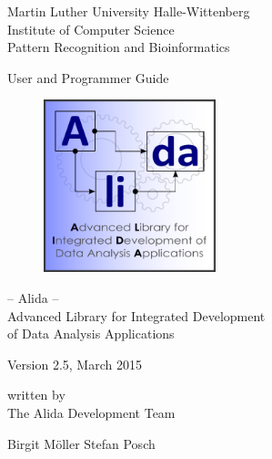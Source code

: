 
\thispagestyle{empty}

\begin{flushleft}
\large{Martin Luther University Halle-Wittenberg} \\
\normalsize{Institute of Computer Science} \\
\normalsize{Pattern Recognition and Bioinformatics}
\end{flushleft}

\vspace*{1cm}

\hrulefill

\vspace*{2cm}

\begin{center}

\large{User and Programmer Guide} \\
\vspace*{0.5cm}

  \begin{figure}[htbp]
    \centering
     \includegraphics[width = 5cm]{../images/Alida_logo.pdf}
  \end{figure}
\Large{
-- Alida -- \\ Advanced Library for Integrated Development \\ of Data Analysis Applications}

\vspace*{0.7cm}

\large{
Version 2.5, March 2015
}
\vspace*{0.5cm}

\normalsize{written by}\\
\vspace*{1.0cm}
\large{The Alida Development Team}\\
\vspace*{1.0cm}
\end{center}

\begin{center}
{\Large
       {Birgit M\"oller} \hspace*{1cm} {Stefan Posch} 
}
\end{center}

